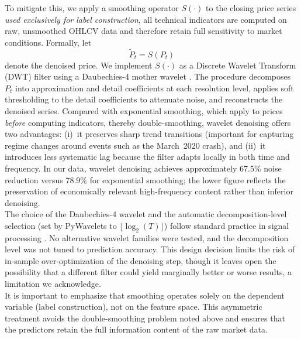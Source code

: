 \documentclass{rQUF2e}
\begin{document}
\noindent To mitigate this, we apply a smoothing operator $S(\cdot)$ to the closing price series \emph{used exclusively for label construction}, all technical indicators are computed on raw, unsmoothed OHLCV data and therefore retain full sensitivity to market conditions. Formally, let
\begin{equation}
\tilde{P}_t = S(P_t)
\end{equation}
denote the denoised price. We implement $S(\cdot)$ as a Discrete Wavelet Transform (DWT) filter using a Daubechies-4 mother wavelet \citep{donoho1994ideal}. The procedure decomposes $P_t$ into approximation and detail coefficients at each resolution level, applies soft thresholding to the detail coefficients to attenuate noise, and reconstructs the denoised series. Compared with exponential smoothing, which \citet{basak2019predicting} apply to prices \emph{before} computing indicators, thereby double-smoothing, wavelet denoising offers two advantages: (i)~it preserves sharp trend transitions (important for capturing regime changes around events such as the March~2020 crash), and (ii)~it introduces less systematic lag because the filter adapts locally in both time and frequency. In our data, wavelet denoising achieves approximately 67.5\% noise reduction versus 78.9\% for exponential smoothing; the lower figure reflects the preservation of economically relevant high-frequency content rather than inferior denoising. \\

\noindent The choice of the Daubechies-4 wavelet and the automatic decomposition-level selection (set by PyWavelets to $\lfloor \log_2(T) \rfloor$) follow standard practice in signal processing \citep{donoho1994ideal}. No alternative wavelet families were tested, and the decomposition level was not tuned to prediction accuracy. This design decision limits the risk of in-sample over-optimization of the denoising step, though it leaves open the possibility that a different filter could yield marginally better or worse results, a limitation we acknowledge. \\

\noindent It is important to emphasize that smoothing operates solely on the dependent variable (label construction), not on the feature space. This asymmetric treatment avoids the double-smoothing problem noted above and ensures that the predictors retain the full information content of the raw market data.
\end{document}
